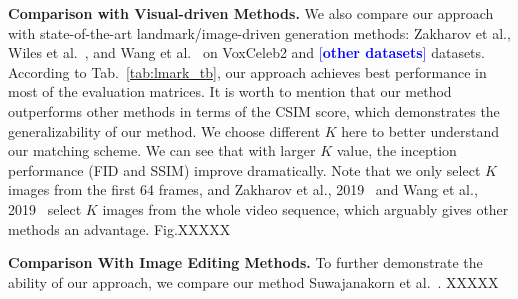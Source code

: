 \documentclass[runningheads]{llncs}
\providecommand{\lchen}[1]{\textcolor{blue}{[{\bf #1}]}}
\begin{document}
\noindent \textbf{Comparison with Visual-driven Methods.} \quad We also compare our approach with state-of-the-art landmark/image-driven generation methods: Zakharov et al.\cite{zakharov2019few}, Wiles et al.~\cite{wiles2018x2face}, and Wang et al.~\cite{wang2018fewshotvid2vid} on VoxCeleb2 and \lchen{other datasets} datasets. According to Tab.~\ref{tab:lmark_tb}, our approach achieves best performance in most of the evaluation matrices. It is worth to mention that our method outperforms other methods in terms of the CSIM score, which demonstrates the generalizability of our method. We choose different $K$ here to better understand our matching scheme. We can see that with larger $K$ value, the inception performance (FID and SSIM) improve dramatically. Note that we only select $K$ images from the first 64 frames, and  Zakharov et al., 2019~\cite{zakharov2019few} and  Wang et al., 2019~\cite{wang2018fewshotvid2vid} select $K$ images from the whole video sequence, which arguably gives other methods an advantage. Fig.XXXXX

\noindent \textbf{Comparison With Image Editing Methods.} 
To further demonstrate the ability of our approach, we compare our method Suwajanakorn et al.~\cite{suwajanakorn2017synthesizing}. XXXXX
\end{document}
